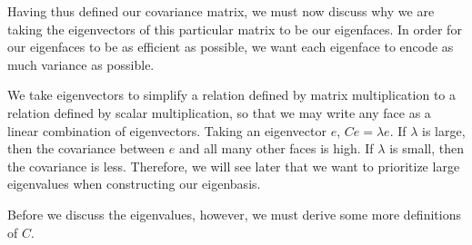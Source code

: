 \documentclass[12pt]{report}
\begin{document}
    
            
            Having thus defined our covariance matrix, we must now discuss why we are taking the eigenvectors of this particular matrix to be our eigenfaces. In order for our eigenfaces to be as efficient as possible, we want each eigenface to encode as much variance as possible. 
            
            We take eigenvectors to simplify a relation defined by matrix multiplication to a relation defined by scalar multiplication, so that we may write any face as a linear combination of eigenvectors. Taking an eigenvector $e$, $C e = \lambda e$. If $\lambda$ is large, then the covariance between $e$ and all many other faces is high. If $\lambda$ is small, then the covariance is less. Therefore, we will see later that we want to prioritize large eigenvalues when constructing our eigenbasis. 
            
            Before we discuss the eigenvalues, however, we must derive some more definitions of $C$.
            
\end{document}
